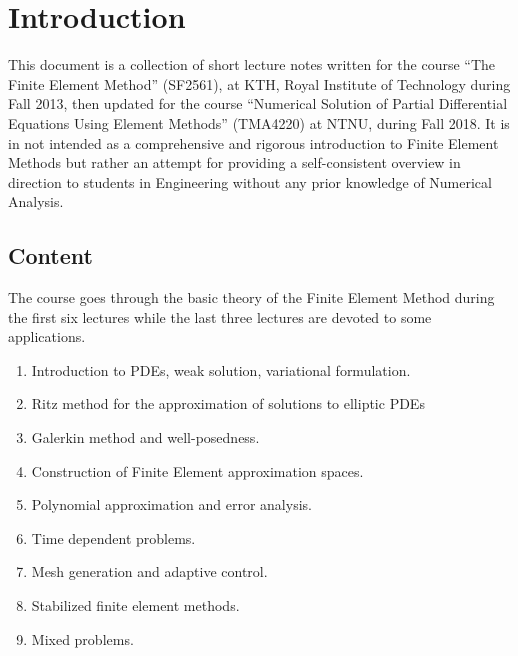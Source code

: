 
\section*{Introduction}

This document is a collection of short lecture notes written for the course ``The Finite Element Method'' (SF2561), at KTH, Royal Institute of Technology during Fall 2013, then updated for the course ``Numerical Solution of Partial Differential Equations Using Element Methods'' (TMA4220) at NTNU, during Fall 2018. It is in not intended as a comprehensive and rigorous introduction to Finite Element Methods but rather an attempt for providing a self-consistent overview in direction to students in Engineering without any prior knowledge of Numerical Analysis.

\subsection*{Content}
The course goes through the basic theory of the Finite Element Method during the first six lectures while the last three lectures are devoted to some applications.

\medskip
\begin{enumerate}
\item Introduction to PDEs, weak solution, variational formulation.
\item Ritz method for the approximation of solutions to elliptic PDEs
\item Galerkin method and well-posedness.
\item Construction of Finite Element approximation spaces.
\item Polynomial approximation and error analysis.
\item Time dependent problems.
\item Mesh generation and adaptive control.
\item Stabilized finite element methods.
\item Mixed problems.
\end{enumerate}

